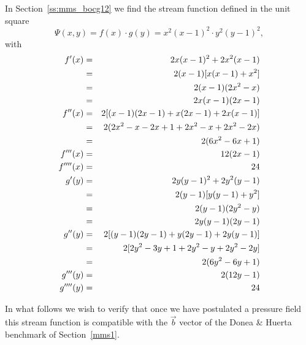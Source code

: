 In Section~\ref{ss:mms_bocg12} we find the stream function 
defined in the unit square
\[
\Psi (x,y)=f(x) \cdot g(y)=x^2(x-1)^2 \cdot y^2(y-1)^2, 
\]
with 
\begin{eqnarray}
f'(x)
&=&2x(x-1)^2+2x^2(x-1) \nonumber\\
&=&2(x-1)[x(x-1)+x^2]  \nonumber\\
&=&2(x-1)(2x^2 -x)  \nonumber\\
&=&2x(x-1)(2x -1)  \nonumber\\
f''(x)
&=& 2 [ (x-1)(2x -1) + x(2x-1)+2x(x-1)] \nonumber\\
&=& 2 (2x^2 -x-2x+1 + 2x^2-x+2x^2-2x) \nonumber\\
&=& 2 (6x^2 -6x +1) \nonumber\\
f'''(x) &=& 12(2x-1) \nonumber\\
f''''(x) &=& 24 \nonumber\\
g'(y)
&=& 2y (y-1)^2 + 2y^2(y-1)  \nonumber\\
&=& 2(y-1)[y(y-1)+y^2] \nonumber\\
&=& 2(y-1)(2y^2-y) \nonumber\\
&=& 2y(y-1)(2y-1) \nonumber\\
g''(y) 
&=& 2[ (y-1)(2y-1) +y(2y-1)+2y(y-1) ] \nonumber\\
&=& 2[ 2y^2 - 3y +1 +2y^2-y +2y^2-2y] \nonumber\\
&=& 2(6y^2 -6y+1) \nonumber\\
g'''(y) &=& 2(12y-1) \nonumber\\
g''''(y) &=& 24 \nonumber
\end{eqnarray}

In what follows we wish to verify that once we have postulated 
a pressure field this stream function is compatible with the 
$\vec{b}$ vector of the Donea \& Huerta benchmark of Section~\ref{mms1}.

